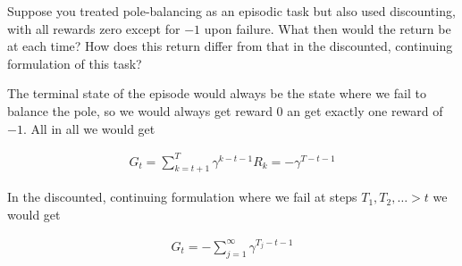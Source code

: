 \begin{exercise}
Suppose you treated pole-balancing as an episodic task but also used discounting, with all rewards zero except for $-1$ upon failure.
What then would the return be at each time?
How does this return differ from that in the discounted, continuing formulation of this task?
\end{exercise}

\begin{solution}
The terminal state of the episode would always be the state where we fail to balance the pole, so we would always get reward $0$ an get exactly one reward of $-1$. All in all we would get

\begin{align*}
  G_t
  =
  \sum_{k=t+1}^T \gamma^{k-t-1} R_k
  =
  -\gamma^{T-t-1}
\end{align*}

In the discounted, continuing formulation where we fail at steps $T_1, T_2, \dots > t$ we would get

\begin{align*}
  G_t
  =
  -\sum_{j = 1}^\infty \gamma^{T_j - t - 1}
\end{align*}
\end{solution}

